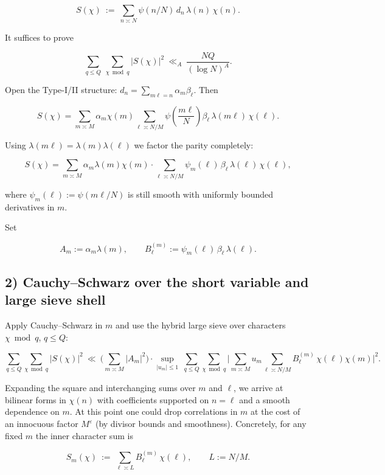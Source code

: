 \documentclass[11pt]{article}
\theoremstyle{definition}
\theoremstyle{remark}
\begin{document}
$$
S(\chi)\ :=\ \sum_{n\asymp N}\psi(n/N)\,d_n\,\lambda(n)\,\chi(n).
$$

It suffices to prove

\begin{equation}
\sum_{q\le Q}\ \sum_{\chi\bmod q}|S(\chi)|^2\ \ll_A\ \frac{NQ}{(\log N)^A}.
\tag{3.2.1}
\end{equation}

Open the Type-I/II structure: $d_n=\sum_{m\ell=n}\alpha_m\beta_\ell$. Then

$$
S(\chi)=\sum_{m\asymp M}\alpha_m\chi(m)\sum_{\ell\asymp N/M}\psi\!\left(\frac{m\ell}{N}\right)\beta_\ell\,\lambda(m\ell)\,\chi(\ell).
$$

Using $\lambda(m\ell)=\lambda(m)\lambda(\ell)$ we factor the parity completely:

$$
S(\chi)=\sum_{m\asymp M}\alpha_m\lambda(m)\chi(m)\cdot
\sum_{\ell\asymp N/M}\psi_m(\ell)\,\beta_\ell\,\lambda(\ell)\,\chi(\ell),
$$

where $\psi_m(\ell):=\psi(m\ell/N)$ is still smooth with uniformly bounded derivatives in $m$.

Set

$$
A_m:=\alpha_m\lambda(m),\qquad
B_\ell^{(m)}:=\psi_m(\ell)\,\beta_\ell\,\lambda(\ell).
$$

\subsection*{2) Cauchy–Schwarz over the short variable and large sieve shell}

Apply Cauchy–Schwarz in $m$ and use the hybrid large sieve over characters $\chi\bmod q$, $q\le Q$:

\begin{equation}
\sum_{q\le Q}\sum_{\chi\bmod q}|S(\chi)|^2
\ \ll\ 
\bigg(\sum_{m\asymp M}|A_m|^2\bigg)
\cdot
\sup_{|u_m|\le 1}\ 
\sum_{q\le Q}\sum_{\chi\bmod q}
\bigg|\sum_{m\asymp M}u_m \sum_{\ell\asymp N/M} B_\ell^{(m)}\,\chi(\ell)\chi(m)\bigg|^2.
\tag{3.2.2}
\end{equation}

Expanding the square and interchanging sums over $m$ and $\ell$, we arrive at bilinear forms in $\chi(n)$ with coefficients supported on $n=\ell$ and a smooth dependence on $m$. At this point one could drop correlations in $m$ at the cost of an innocuous factor $M^\varepsilon$ (by divisor bounds and smoothness). Concretely, for any fixed $m$ the inner character sum is

$$
S_m(\chi)\ :=\ \sum_{\ell\asymp L} B_\ell^{(m)}\,\chi(\ell),\qquad L:=N/M.
$$
\end{document}
